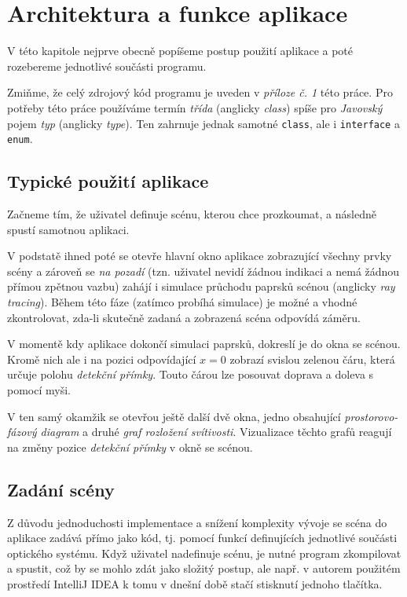 \section{Architektura a funkce aplikace}

V této kapitole nejprve obecně popíšeme postup použití aplikace a poté rozebereme jednotlivé součásti programu.

Zmiňme, že celý zdrojový kód programu je uveden v \emph{příloze č. 1} této práce. Pro potřeby této práce používáme termín \emph{třída} (anglicky \emph{class}) spíše pro \emph{Javovský} pojem \emph{typ} (anglicky \emph{type}). Ten zahrnuje jednak samotné \texttt{class}, ale i \texttt{interface} a \texttt{enum}.\src

\subsection{Typické použití aplikace}

Začneme tím, že uživatel definuje scénu, kterou chce prozkoumat, a následně spustí samotnou aplikaci.

V podstatě ihned poté se otevře hlavní okno aplikace zobrazující všechny prvky scény a zároveň se \emph{na pozadí} (tzn. uživatel nevidí žádnou indikaci a nemá žádnou přímou zpětnou vazbu) zahájí i simulace průchodu paprsků scénou (anglicky \emph{ray tracing}). Během této fáze (zatímco probíhá simulace) je možné a vhodné zkontrolovat, zda-li skutečně zadaná a zobrazená scéna odpovídá záměru.

V momentě kdy aplikace dokončí simulaci paprsků, dokreslí je do okna se scénou. Kromě nich ale i na pozici odpovídající $ x = 0 $ zobrazí svislou zelenou čáru, která určuje polohu \emph{detekční přímky}. Touto čárou lze posouvat doprava a doleva s pomocí myši.

V ten samý okamžik se otevřou ještě další dvě okna, jedno obsahující \emph{prostorovo-fázový diagram} a druhé \emph{graf rozložení svítivosti}. Vizualizace těchto grafů reagují na změ\-ny pozice \emph{detekční přímky} v okně se scénou.

\subsection{Zadání scény}
\label{sub:architekturaaplikace_zadanisceny}

Z důvodu jednoduchosti implementace a snížení komplexity vývoje se scéna do aplikace zadává přímo jako kód, tj. pomocí funkcí definujících jednotlivé součásti optického systému. Když uživatel nadefinuje scénu, je nutné program zkompilovat a spustit, což by se mohlo zdát jako složitý postup, ale např. v autorem použitém prostředí IntelliJ IDEA k tomu v dnešní době stačí stisknutí jednoho tlačítka.

